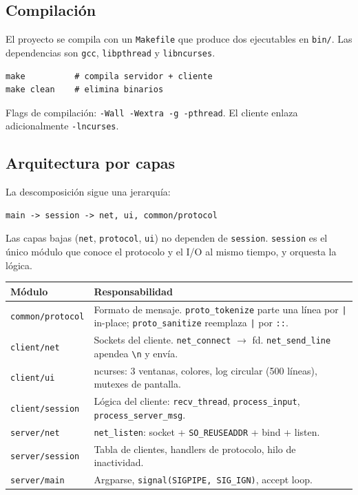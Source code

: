 \documentclass[12pt,a4paper]{article}
\begin{document}
\subsection{Compilación}

El proyecto se compila con un \texttt{Makefile} que produce dos ejecutables en
\texttt{bin/}.  Las dependencias son \texttt{gcc}, \texttt{libpthread} y
\texttt{libncurses}.

\begin{lstlisting}[style=protocol]
make          # compila servidor + cliente
make clean    # elimina binarios
\end{lstlisting}

Flags de compilación: \texttt{-Wall -Wextra -g -pthread}.  El cliente enlaza
adicionalmente \texttt{-lncurses}.

\subsection{Arquitectura por capas}

La descomposición sigue una jerarquía:

\begin{lstlisting}[style=protocol]
main -> session -> net, ui, common/protocol
\end{lstlisting}

Las capas bajas (\texttt{net}, \texttt{protocol}, \texttt{ui}) no dependen de
\texttt{session}.  \texttt{session} es el único módulo que conoce el protocolo y el
I/O al mismo tiempo, y orquesta la lógica.

\begin{center}
\begin{tabular}{lp{10cm}}
\toprule
\textbf{Módulo} & \textbf{Responsabilidad} \\
\midrule
\texttt{common/protocol} & Formato de mensaje.  \texttt{proto\_tokenize} parte una línea por \texttt{|} in-place; \texttt{proto\_sanitize} reemplaza \texttt{|} por \texttt{::}. \\
\texttt{client/net} & Sockets del cliente.  \texttt{net\_connect} $\to$ fd.  \texttt{net\_send\_line} apendea \texttt{\textbackslash n} y envía. \\
\texttt{client/ui} & ncurses: 3 ventanas, colores, log circular (500 líneas), mutexes de pantalla. \\
\texttt{client/session} & Lógica del cliente: \texttt{recv\_thread}, \texttt{process\_input}, \texttt{process\_server\_msg}. \\
\texttt{server/net} & \texttt{net\_listen}: socket + \texttt{SO\_REUSEADDR} + bind + listen. \\
\texttt{server/session} & Tabla de clientes, handlers de protocolo, hilo de inactividad. \\
\texttt{server/main} & Argparse, \texttt{signal(SIGPIPE, SIG\_IGN)}, accept loop. \\
\bottomrule
\end{tabular}
\end{center}
\end{document}
